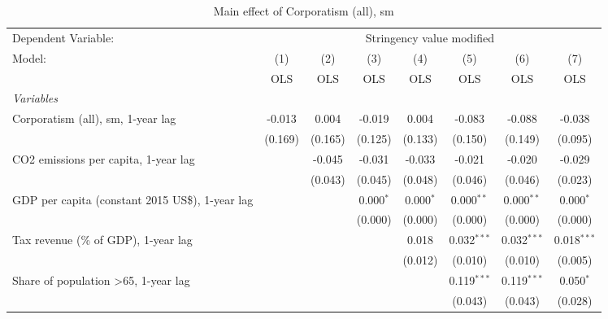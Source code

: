 
\begin{table}[htbp]
   \caption{Main effect of Corporatism (all), sm}
   \centering
   \begin{tabular}{lccccccc}
      \toprule
      Dependent Variable: & \multicolumn{7}{c}{Stringency value modified}\\
      Model:                                                & (1)     & (2)     & (3)         & (4)         & (5)           & (6)           & (7)\\  
                                                            &  OLS    & OLS     & OLS         & OLS         & OLS           & OLS           & OLS\\  
      \midrule
      \emph{Variables}\\
      Corporatism (all), sm, 1-year lag                     & -0.013  & 0.004   & -0.019      & 0.004       & -0.083        & -0.088        & -0.038\\   
                                                            & (0.169) & (0.165) & (0.125)     & (0.133)     & (0.150)       & (0.149)       & (0.095)\\   
      CO2 emissions per capita, 1-year lag                  &         & -0.045  & -0.031      & -0.033      & -0.021        & -0.020        & -0.029\\   
                                                            &         & (0.043) & (0.045)     & (0.048)     & (0.046)       & (0.046)       & (0.023)\\   
      GDP per capita (constant 2015 US\$), 1-year lag       &         &         & 0.000$^{*}$ & 0.000$^{*}$ & 0.000$^{**}$  & 0.000$^{**}$  & 0.000$^{*}$\\   
                                                            &         &         & (0.000)     & (0.000)     & (0.000)       & (0.000)       & (0.000)\\   
      Tax revenue (\% of GDP), 1-year lag                   &         &         &             & 0.018       & 0.032$^{***}$ & 0.032$^{***}$ & 0.018$^{***}$\\   
                                                            &         &         &             & (0.012)     & (0.010)       & (0.010)       & (0.005)\\   
      Share of population >65, 1-year lag                   &         &         &             &             & 0.119$^{***}$ & 0.119$^{***}$ & 0.050$^{*}$\\   
                                                            &         &         &             &             & (0.043)       & (0.043)       & (0.028)\\   

\end{tabular}
\end{table}
